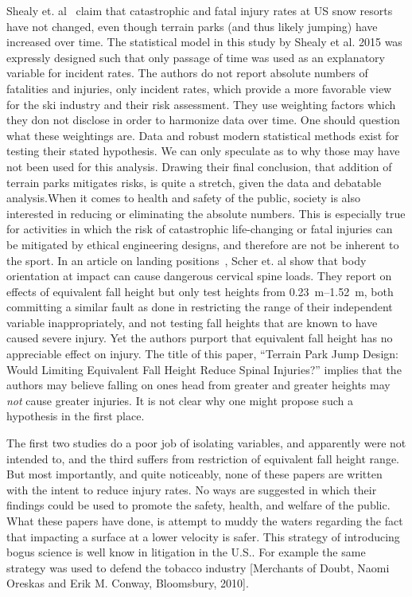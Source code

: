 \documentclass{article}
\begin{document}
Shealy et. al~\cite{Shealy2015} claim that catastrophic and fatal injury rates
at US snow resorts have not changed, even though terrain parks (and thus likely
jumping) have increased over time. The statistical model in this study by
Shealy et al. 2015 was expressly designed such that only passage of time was
used as an explanatory variable for incident rates. The authors do not report
absolute numbers of fatalities and injuries, only incident rates, which provide
a more favorable view for the ski industry and their risk assessment. They use
weighting factors which they don not disclose in order to harmonize data over
time. One should question what these weightings are.  Data and robust modern
statistical methods exist for testing their stated hypothesis. We can only
speculate as to why those may have not been used for this analysis. Drawing
their final conclusion, that addition of terrain parks mitigates risks, is
quite a stretch, given the data and debatable analysis.When it comes to health
and safety of the public, society is also interested in reducing or eliminating
the absolute numbers. This is especially true for activities in which the risk
of catastrophic life-changing or fatal injuries can be mitigated by ethical
engineering designs, and therefore are not be inherent to the sport.
%
In an article on landing positions~\cite{Scher2015}, Scher et. al show that
body orientation at impact can cause dangerous cervical spine loads. They
report on effects of equivalent fall height but only test heights from
\SIrange{0.23}{1.52}{\meter}, both committing a similar fault as done in
\cite{Shealy2010} restricting the range of their independent variable
inappropriately, and not testing fall heights that are known to have caused
severe injury. Yet the authors purport that equivalent fall height has no
appreciable effect on injury. The title of this paper, ``Terrain Park Jump
Design: Would Limiting Equivalent Fall Height Reduce Spinal Injuries?'' implies
that the authors may believe falling on ones head from greater and greater
heights may \emph{not} cause greater injuries. It is not clear why one might
propose such a hypothesis in the first place.

The first two studies do a poor job of isolating variables, and apparently were
not intended to, and the third suffers from restriction of equivalent fall
height range. But most importantly, and quite noticeably, none of these papers
are written with the intent to reduce injury rates. No ways are suggested in
which their findings could be used to promote the safety, health, and welfare
of the public. What these papers have done, is attempt to muddy the waters
regarding the fact that impacting a surface at a lower velocity is safer. This
strategy of introducing bogus science is well know in litigation in the U.S..
For example the same strategy was used to defend the tobacco industry
[Merchants of Doubt, Naomi Oreskas and Erik M. Conway, Bloomsbury, 2010].
\end{document}
